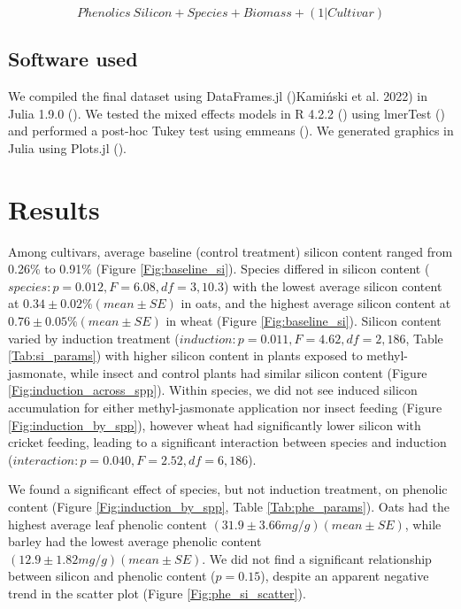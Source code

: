 \documentclass[12pt, letterpaper]{report}
\begin{document}
\[Phenolics ~ Silicon + Species + Biomass + (1|Cultivar)\]

\subsection{Software used}

We compiled the final dataset using DataFrames.jl (\cite{bogumil_kaminski_2023_7632427})Kamiński et al. 2022) in Julia 1.9.0 (\cite{bezanson2017julia}). We tested the mixed effects models in R 4.2.2 (\cite{r_core_team_2022}) using lmerTest (\cite{kuznetsova_2017_lmerTest}) and performed a post-hoc Tukey test using emmeans (\cite{lenth_2023_emmeans}). We generated graphics in Julia using Plots.jl (\cite{tom_breloff_2023_7736124}).

\section{Results}

Among cultivars, average baseline (control treatment) silicon content ranged from 0.26\% to 0.91\% (Figure \ref{Fig:baseline_si}). Species differed in silicon content ($species: p = 0.012, F = 6.08, df = 3,10.3$) with the lowest average silicon content at $0.34 \pm 0.02\% (mean \pm SE)$ in oats, and  the highest average silicon content at $0.76 \pm 0.05\% (mean \pm SE)$ in wheat (Figure \ref{Fig:baseline_si}). Silicon content varied by induction treatment ($induction: p = 0.011, F = 4.62, df = 2,186$, Table \ref{Tab:si_params}) with higher silicon content in plants exposed to methyl-jasmonate, while insect and control plants had similar silicon content (Figure \ref{Fig:induction_across_spp}). Within species, we did not see induced silicon accumulation for either methyl-jasmonate application nor insect feeding (Figure \ref{Fig:induction_by_spp}), however wheat had significantly lower silicon with cricket feeding, leading to a significant interaction between species and induction ($interaction: p=0.040, F = 2.52, df = 6,186$). 

We found a significant effect of species, but not induction treatment, on phenolic content (Figure \ref{Fig:induction_by_spp}, Table \ref{Tab:phe_params}). Oats had the highest average leaf phenolic content $(31.9 \pm 3.66 mg/g) (mean \pm SE)$, while barley had the lowest average phenolic content $(12.9 \pm 1.82 mg/g) (mean \pm SE)$. We did not find a significant relationship between silicon and phenolic content ($p = 0.15$), despite an apparent negative trend in the scatter plot (Figure \ref{Fig:phe_si_scatter}).
\end{document}
